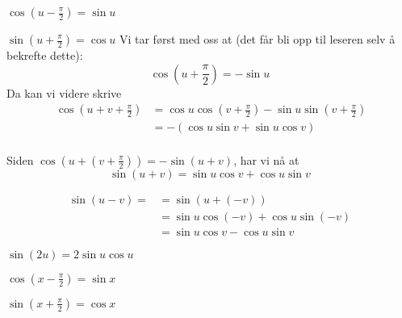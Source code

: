 {\boldmath $ \cos\left(u-\frac{\pi}{2}\right)=\sin u $}

{\boldmath $ \sin \left(u + \frac{\pi}{2}\right)=\cos u $} 
\bs
Vi tar først med oss at (det får bli opp til leseren selv å bekrefte dette):
\[ \cos \left(u+\frac{\pi}{2}\right)=-\sin u \]
Da kan vi videre skrive
\begin{align*}\
\cos \left(u+ v+\frac{\pi}{2}\right) &= \cos u \cos \left(v+\frac{\pi}{2}\right) - \sin u \sin\left(v+\frac{\pi}{2}\right) \\
&= -(\cos u \sin v + \sin u \cos v )
\end{align*} 
\\
Siden  $ \cos \left(u+ \left(v+\frac{\pi}{2}\right)\right) = -\sin (u+v) $, har vi nå at
\[\sin (u+v) = \sin u \cos v +\cos u \sin v \]

 \label{sin2xbevis}
\begin{align*}
\sin(u-v) =&=\sin (u+(-v)) \\
&= \sin u \cos (-v) + \cos u \sin (-v) \\
&= \sin u \cos v - \cos u \sin v 
\end{align*}

{\boldmath $ \sin (2u)=2\sin u \cos u $}

{\boldmath $ \cos\left(x-\frac{\pi}{2}\right)=\sin x $}

{\boldmath $ \sin\left(x+\frac{\pi}{2}\right)=\cos x $}

